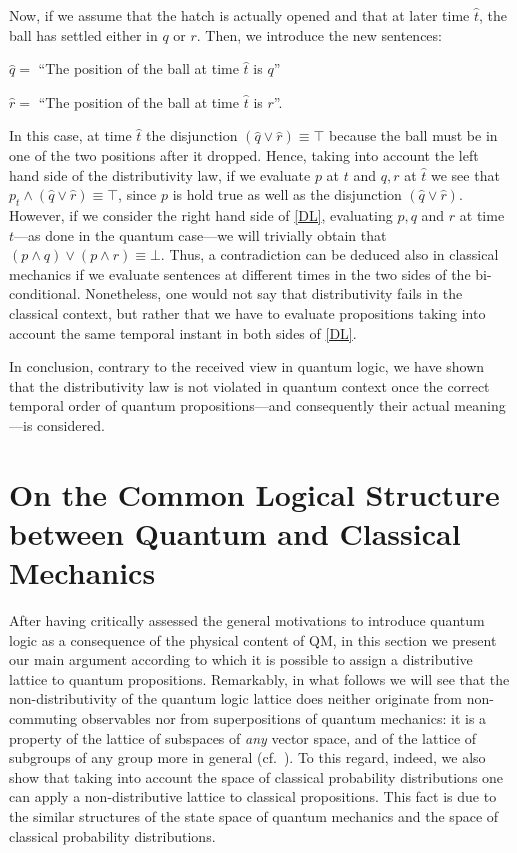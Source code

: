 \documentclass[11pt, executivepaper]{article}
\begin{document}
Now, if we assume that the hatch is actually opened and that at later time $\hat{t}$, the ball has settled either in $q$ or $r$. Then, we introduce the new sentences:

\begin{description}
    \item $\hat{q} =$ ``The position of the ball at time $\hat{t}$ is $q$''
    \item $\hat{r} =$ ``The position of the ball at time $\hat{t}$ is $r$''.
\end{description}

In this case, at time $\hat{t}$ the disjunction $(\hat{q} \vee \hat{r}) \equiv \top$ because the ball must be in one of the two positions after it dropped. Hence, taking into account the left hand side of the distributivity law, if we evaluate $p$ at $t$ and $q, r$ at $\hat{t}$ we see that $p_t \wedge (\hat{q} \vee \hat{r}) \equiv \top$, since $p$ is hold true as well as the disjunction $(\hat{q} \vee \hat{r})$. However, if we consider the right hand side of \eqref{DL}, evaluating $p, q$ and $r$ at time $t$---as done in the quantum case---we will trivially obtain that $(p \wedge  q) \vee (p \wedge r)\equiv \bot$. Thus, a contradiction can be deduced also in classical mechanics if we evaluate sentences at different times in the two sides of the bi-conditional. Nonetheless, one would not say that distributivity fails in the classical context, but rather that we have to evaluate propositions taking into account the same temporal instant in both sides of \eqref{DL}. 

In conclusion, contrary to the received view in quantum logic, we have shown that the distributivity law is not violated in quantum context once the correct temporal order of quantum propositions---and consequently their actual meaning---is considered.

\section{On the Common Logical Structure between Quantum and Classical Mechanics}
\label{Math}

After having critically assessed the general motivations to introduce quantum logic as a consequence of the physical content of QM, in this section we present our main argument according to which it is possible to assign a distributive lattice to quantum propositions. Remarkably, in what follows we will see that the non-distributivity of the quantum logic lattice does neither originate from non-commuting observables nor from superpositions of quantum mechanics: it is a property of the lattice of subspaces of \emph{any} vector space, and of the lattice of subgroups of any group more in general (cf.\ \cite{Davey:2002}). To this regard, indeed, we also show that taking into account the space of classical probability distributions one can apply a non-distributive lattice to classical propositions. This fact is due to the similar structures of the state space of quantum mechanics and the space of classical probability distributions. 
\end{document}
